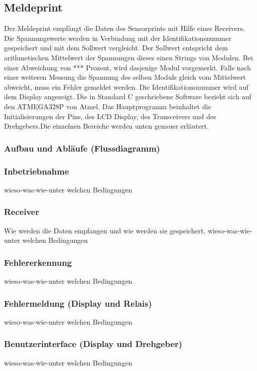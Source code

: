 \subsection{Meldeprint}
Der Meldeprint empfängt die Daten des Sensorprints mit Hilfe eines Receivers. Die Spannungswerte werden in Verbindung mit der Identifikationsnummer gespeichert und mit dem Sollwert vergleicht. Der Sollwert entspricht dem arithmetischen Mittelwert der Spannungen dieses einen Strings von Modulen. Bei einer Abweichung von *** Prozent, wird dasjenige Modul vorgemerkt. Falls nach einer weiteren Messung die Spannung des selben Moduls gleich vom Mittelwert abweicht, muss ein Fehler gemeldet werden. Die Identifikationsnummer wird auf dem Display angezeigt. Die in Standard C geschriebene Software bezieht sich auf den ATMEGA328P von Atmel. Das Hauptprogramm beinhaltet die Initialisierungen der Pins, des LCD Display, des Transceivers und des Drehgebers.Die einzelnen Bereiche werden unten genauer erläutert.
\subsubsection{Aufbau und Abläufe (Flussdiagramm)}
\subsubsection{Inbetriebnahme}
wieso-was-wie-unter welchen Bedingungen
\subsubsection{Receiver}
Wie werden die Daten empfangen und wie werden sie gespeichert.
wieso-was-wie-unter welchen Bedingungen
\subsubsection{Fehlererkennung}
wieso-was-wie-unter welchen Bedingungen
\subsubsection{Fehlermeldung (Display und Relais)}
wieso-was-wie-unter welchen Bedingungen
\subsubsection{Benutzerinterface (Display und Drehgeber)}
wieso-was-wie-unter welchen Bedingungen



